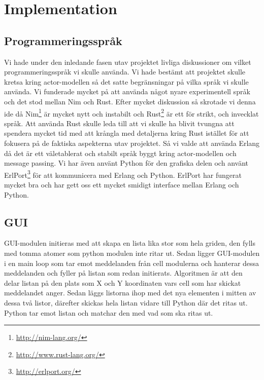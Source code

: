 \chapter{Implementation}

\label{ch:Implementation} 


\section{Programmeringsspråk}

Vi hade under den inledande fasen utav projektet livliga diskussioner om vilket programmeringsspråk vi skulle använda. Vi hade bestämt att projektet skulle kretsa kring actor-modellen så det satte begränsningar på vilka språk vi skulle använda. Vi funderade mycket på att använda något nyare experimentell språk och det stod mellan Nim och Rust. Efter mycket diskussion så skrotade vi denna ide då Nim\footnote{\url{http://nim-lang.org/}} är mycket nytt och instabilt och Rust\footnote{\url{http://www.rust-lang.org/}} är ett för strikt, och invecklat språk. Att använda Rust skulle leda till att vi skulle ha blivit tvungna att spendera mycket tid med att krångla med detaljerna kring Rust istället för att fokusera på de faktiska aspekterna utav projektet. Så vi valde att använda Erlang då det är ett väletablerat och stabilt språk byggt kring actor-modellen och message passing. Vi har även använt Python för den grafiska delen och använt ErlPort\footnote{\url{http://erlport.org/}} för att kommunicera med Erlang och Python. ErlPort har fungerat mycket bra och har gett oss ett mycket smidigt interface mellan Erlang och Python.


\section{GUI}

GUI-modulen initieras med att skapa en lista lika stor som hela griden, den fylls med tomma atomer som python modulen inte ritar ut. Sedan ligger GUI-modulen i en main loop som tar emot meddelanden från cell modulerna och hanterar dessa meddelanden och fyller på listan som redan initierats. Algoritmen är att den delar listan på den plats som X och Y koordinaten vars cell som har skickat meddelandet anger. Sedan läggs listorna ihop med det nya elementen i mitten av dessa två listor, därefter skickas hela listan vidare till Python där det ritas ut. Python tar emot listan och matchar den med vad som ska ritas ut.

